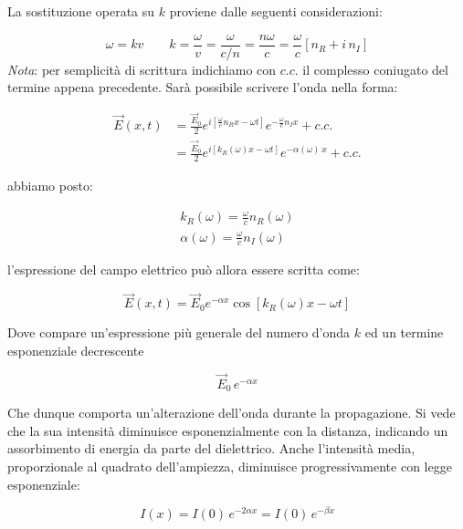 La sostituzione operata su $k$ proviene dalle seguenti considerazioni:

\[
	\omega = kv \qquad k = \frac{\omega}{v} = \frac{\omega}{c/n} = \frac{n\omega}{c} = \frac{\omega}{c} [n_R + i\,n_I]
\]
\emph{Nota}: per semplicità di scrittura indichiamo con $c.c.$ il complesso coniugato del termine appena precedente.
Sarà possibile scrivere l'onda nella forma:

\begin{equation*}
	\begin{aligned}
		\vec{E} (x,t) &= \frac{\vec{E}_0}{2}e^{i\left[ \frac{\omega}{c}n_R x-\omega t \right]} e^{-\frac{\omega}{c}n_I x} + c.c. \\
		&= \frac{\vec{E}_0}{2} e^{i[k_R(\omega) x - \omega t ]} e^{-\alpha(\omega)\,x} + c.c.
	\end{aligned}
\end{equation*}

abbiamo posto:

\begin{gather*}
	k_R(\omega) = \frac{\omega}{c} n_R(\omega) \\
	\alpha (\omega) = \frac{\omega}{c} n_I(\omega)
\end{gather*}

l'espressione del campo elettrico può allora essere scritta come:

\[
	\boxed{\vec{E} (x,t) = \vec{E}_0 e^{-\alpha x} \cos [k_R(\omega)x-\omega t]}
\]

Dove compare un'espressione più generale del numero d'onda $k$ ed un termine esponenziale decrescente

\[
	\vec{E}_0\,e^{-\alpha x}
\]

Che dunque comporta un'alterazione dell'onda durante la propagazione. Si vede che la sua intensità diminuisce esponenzialmente con la distanza, indicando un assorbimento di energia da parte del dielettrico. Anche l'intensità media, proporzionale al quadrato dell'ampiezza, diminuisce progressivamente con legge esponenziale:

\[
	I(x) = I(0)\,e^{-2\alpha x} = I(0)\,e^{-\beta x}
\]

